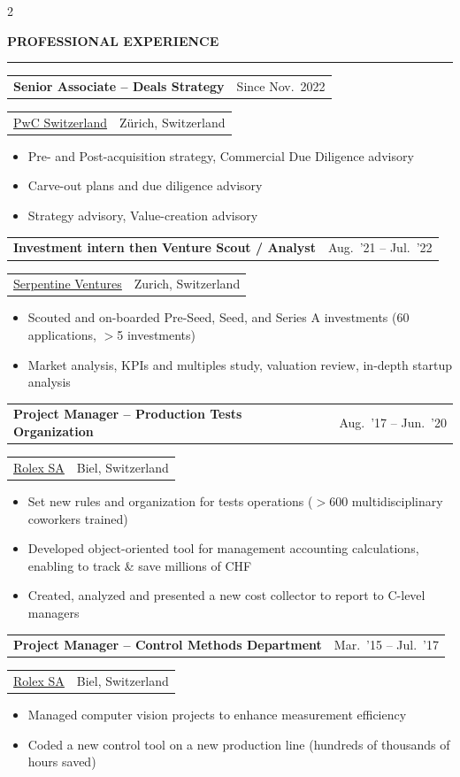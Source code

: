 \documentclass[a4paper,11pt]{article}
\makeatletter
\newlength{\sidebarW}
\newlength{\entryRowGap}          %
\newlength{\entryBottomGap}       %
\newlength{\entryGap}             %
\newlength{\sectionRuleGap}       %
\newlength{\sectionBodyGap}       %
\newcommand{\mainSection}[2][\relax]{%
  \noindent\Large\textbf{%
    \ifx#1\relax\else{\normalsize\color{black}#1\hspace{5pt}}\fi%
    #2%
  }\par\vspace{\sectionRuleGap}%
  \noindent\rule{\linewidth}{0.5pt}\par\vspace{\sectionBodyGap}%
}
\newenvironment{experience}[5]{%
  \noindent\begin{tabular*}{\linewidth}{@{}l@{\extracolsep{\fill}}r@{}}
    {\large\textbf{#2}} & {\small\color{SubtleGray}#1}%
  \end{tabular*}\par\vspace{\entryRowGap}%
  \noindent\begin{tabular*}{\linewidth}{@{}l@{\extracolsep{\fill}}r@{}}
    {\small\href{#5}{\color{CompanyColor}\ul{#3}}} & {\small\color{LocationColor}#4}%
  \end{tabular*}\par\vspace{\entryBottomGap}%
  \begin{itemize}[%
    leftmargin=1.2em,%
    label={\small$\cdot$},%
    itemsep=2pt,%
    parsep=0pt,%
    topsep=0pt,%
    partopsep=0pt%
  ]\small%
}{%
  \end{itemize}\vspace{\entryGap}%
}
\makeatother
\begin{document}
\begin{paracol}{2}
\begin{minipage}[t]{\dimexpr\paperwidth-\sidebarW-22pt\relax}
    \mainSection[\faBriefcase]{PROFESSIONAL EXPERIENCE}

    \begin{experience}{Since Nov.~2022}%
                      {Senior Associate -- Deals Strategy}%
                      {PwC Switzerland}%
                      {Zürich, Switzerland}%
                      {https://www.pwc.ch}
      \item Pre- and Post-acquisition strategy, Commercial Due Diligence advisory
      \item Carve-out plans and due diligence advisory
      \item Strategy advisory, Value-creation advisory
    \end{experience}

    \begin{experience}{Aug.~'21 -- Jul.~'22}%
                      {Investment intern then Venture Scout / Analyst}%
                      {Serpentine Ventures}%
                      {Zurich, Switzerland}%
                      {https://www.serpentine.vc/}
      \item Scouted and on-boarded Pre-Seed, Seed, and Series A investments (60 applications, $>$5 investments)
      \item Market analysis, KPIs and multiples study, valuation review, in-depth startup analysis
    \end{experience}

    \begin{experience}{Aug.~'17 -- Jun.~'20}%
                      {Project Manager -- Production Tests Organization}%
                      {Rolex SA}%
                      {Biel, Switzerland}%
                      {https://www.rolex.com}
      \item Set new rules and organization for tests operations ($>$600 multidisciplinary coworkers trained)
      \item Developed object-oriented tool for management accounting calculations, enabling to track \& save millions of CHF
      \item Created, analyzed and presented a new cost collector to report to C-level managers
    \end{experience}

    \begin{experience}{Mar.~'15 -- Jul.~'17}%
                      {Project Manager -- Control Methods Department}%
                      {Rolex SA}%
                      {Biel, Switzerland}%
                      {https://www.rolex.com}
      \item Managed computer vision projects to enhance measurement efficiency
      \item Coded a new control tool on a new production line (hundreds of thousands of hours saved)
    \end{experience}


\end{minipage}
\end{paracol}
\end{document}
